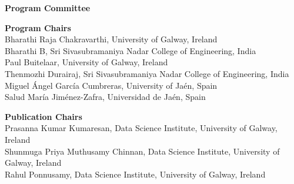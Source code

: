 \documentclass[11pt,oneside]{book}
\begin{document}

{}
\begin{center}
\Large \textbf{Program Committee}
\end{center}
\vspace*{1cm}
\begin{description}
  \item{\bf Program Chairs}\vspace{2mm}\\
            Bharathi Raja Chakravarthi, University of Galway, Ireland\\
          Bharathi B, Sri Sivasubramaniya Nadar College of Engineering, India\\
          Paul Buitelaar, University of Galway, Ireland\\
          Thenmozhi Durairaj, Sri Sivasubramaniya Nadar College of Engineering, India\\
          Miguel Ángel García Cumbreras, University of Jaén, Spain\\
          Salud María Jiménez-Zafra, Universidad de Jaén, Spain\\
      
  \item{\bf Publication Chairs}\vspace{2mm}\\
            Prasanna Kumar Kumaresan, Data Science Institute, University of Galway, Ireland\\
          Shunmuga Priya Muthusamy Chinnan, Data Science Institute, University of Galway, Ireland\\
          Rahul Ponnusamy, Data Science Institute, University of Galway, Ireland\\
      

\end{description}
\end{document}
